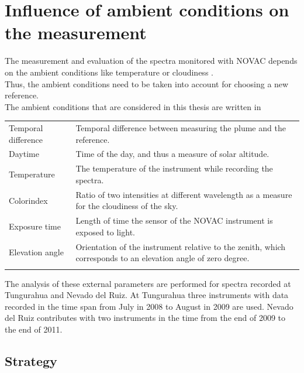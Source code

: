 \section{Influence of ambient conditions on the measurement \label{Chap:BROErr}}
The measurement and evaluation of the spectra monitored with NOVAC depends on the ambient conditions like temperature or cloudiness \citep{lubcke2014optical}.\\
Thus, the ambient conditions need to be taken into account for choosing a new reference.
\\
The ambient conditions that are considered in this thesis are written in 
\begin{table}[h!]
	\centering
	\begin{tabular}{p{4cm}p{8.5cm}}
		Temporal difference &Temporal difference between measuring the plume and the reference.\\
		Daytime & Time of the day, and thus a measure of solar altitude.\\
		Temperature& The temperature of the instrument while recording the spectra.\\
		Colorindex&Ratio of two intensities at different wavelength as a measure for the cloudiness of the sky.\\
		Exposure time& Length of time the sensor of the NOVAC instrument is exposed to light.\\
		Elevation angle& Orientation of the instrument relative to the zenith, which corresponds to an elevation angle of zero degree.\\
		\label{tab:externalparametters}
	\end{tabular}
\end{table}	
%
The analysis of these external parameters are performed for spectra recorded at Tungurahua and Nevado del Ruiz. At Tungurahua three instruments with data recorded in the time span from July in 2008 to August in 2009 are used. Nevado del Ruiz contributes with two instruments in the time from the end of 2009 to the end of 2011.


\subsection{Strategy}

